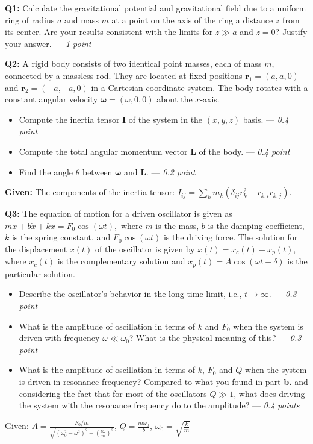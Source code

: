 \documentclass[a4paper,12pt]{article}
\begin{document}
\textbf{Q1:} Calculate the gravitational potential and gravitational field due to a uniform ring of radius $a$ and mass $m$ at a point on the axis of the ring a distance $z$ from its center. Are your results consistent with the limits for $z\gg a$ and $z = 0$? Justify your answer. --- \textit{1 point}

\textbf{Q2:} A rigid body consists of two identical point masses, each of mass $m$, connected by a massless rod. They are located at fixed positions $\mathbf{r}_1 = (a, a, 0)$ and $\mathbf{r}_2 = (-a, -a, 0)$ in a Cartesian coordinate system. The body rotates with a constant angular velocity $\boldsymbol{\omega} = (\omega, 0, 0)$ about the $x$-axis.

\begin{itemize}
    \item[\textbf{a.}] Compute the inertia tensor $\mathbf{I}$ of the system in the $(x,y,z)$ basis. --- \textit{0.4 point}
    \item[\textbf{b.}] Compute the total angular momentum vector $\mathbf{L}$ of the body. --- \textit{0.4 point}
    \item[\textbf{c.}] Find the angle $\theta$ between $\boldsymbol{\omega}$ and $\mathbf{L}$. --- \textit{0.2 point}
\end{itemize}
\textbf{Given:} The components of the inertia tensor: $I_{ij} = \sum_k m_k\left(\delta_{ij} r_k^2 - r_{k,i} r_{k,j}\right)$.

\textbf{Q3:} The equation of motion for a driven oscillator is given as $m \ddot{x} + b \dot{x} + k x = F_0 \cos(\omega t),$ where $m$ is the mass, $b$ is the damping coefficient, $k$ is the spring constant, and $F_0 \cos(\omega t)$ is the driving force. The solution for the displacement $x(t)$ of the oscillator is given by $x(t) = x_c(t) + x_p(t)$, where $x_c(t)$ is the complementary solution and $x_p(t) = A \cos(\omega t - \delta)$ is the particular solution. 

\begin{itemize}
    \item[\textbf{a.}] Describe the oscillator's behavior in the long-time limit, i.e., $t \to \infty$. --- \textit{0.3 point}
    \item[\textbf{b.}] What is the amplitude of oscillation in terms of $k$ and $F_0$ when the system is driven with frequency $\omega \ll \omega_0$? What is the physical meaning of this? --- \textit{0.3 point}
    \item[\textbf{c.}] What is the amplitude of oscillation in terms of $k$, $F_0$ and $Q$ when the system is driven in resonance frequency? Compared to what you found in part \textbf{b.} and considering the fact that for most of the oscillators $Q\gg 1$, what does driving the system with the resonance frequency do to the amplitude? --- \textit{0.4 points}
\end{itemize}
Given: $A = \frac{F_0/m}{\sqrt{\left(\omega_0^2 - \omega^2\right)^2 + \left(\frac{b \omega}{m}\right)^2}}$, $Q = \frac{m \omega_0}{b}$, $\omega_0 = \sqrt{\frac{k}{m}}$
\end{document}
